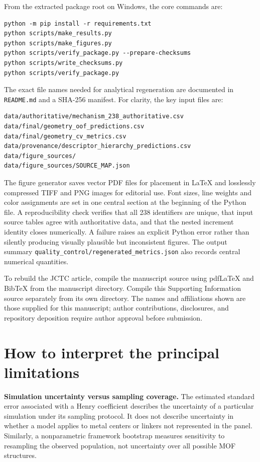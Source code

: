 \documentclass[11pt,a4paper]{article}
\begin{document}
From the extracted package root on Windows, the core commands are:
\begin{verbatim}
python -m pip install -r requirements.txt
python scripts/make_results.py
python scripts/make_figures.py
python scripts/verify_package.py --prepare-checksums
python scripts/write_checksums.py
python scripts/verify_package.py
\end{verbatim}

The exact file names needed for analytical regeneration are documented in \texttt{README.md} and a SHA-256 manifest. For clarity, the key input files are:
\begin{verbatim}
data/authoritative/mechanism_238_authoritative.csv
data/final/geometry_oof_predictions.csv
data/final/geometry_cv_metrics.csv
data/provenance/descriptor_hierarchy_predictions.csv
data/figure_sources/
data/figure_sources/SOURCE_MAP.json
\end{verbatim}
The figure generator saves vector PDF files for placement in LaTeX and losslessly compressed TIFF and PNG images for editorial use. Font sizes, line weights and color assignments are set in one central section at the beginning of the Python file. A reproducibility check verifies that all 238 identifiers are unique, that input source tables agree with authoritative data, and that the nested increment identity closes numerically. A failure raises an explicit Python error rather than silently producing visually plausible but inconsistent figures. The output summary \texttt{quality\_control/regenerated\_metrics.json} also records central numerical quantities.

To rebuild the JCTC article, compile the manuscript source using pdfLaTeX and BibTeX from the manuscript directory. Compile this Supporting Information source separately from its own directory. The names and affiliations shown are those supplied for this manuscript; author contributions, disclosures, and repository deposition require author approval before submission.

\section{How to interpret the principal limitations}

\textbf{Simulation uncertainty versus sampling coverage.} The estimated standard error associated with a Henry coefficient describes the uncertainty of a particular simulation under its sampling protocol. It does not describe uncertainty in whether a model applies to metal centers or linkers not represented in the panel. Similarly, a nonparametric framework bootstrap measures sensitivity to resampling the observed population, not uncertainty over all possible MOF structures.
\end{document}

